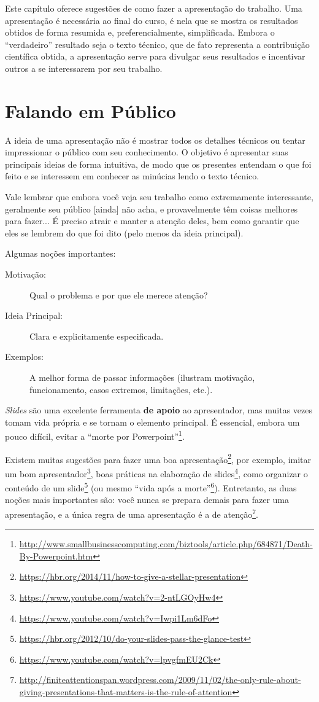 Este capítulo oferece sugestões de como fazer a apresentação do trabalho. Uma
apresentação é necessária ao final do curso, é nela que se mostra os resultados
obtidos de forma resumida e, preferencialmente, simplificada. Embora o ``verdadeiro''
resultado seja o texto técnico, que de fato representa a contribuição científica
obtida, a apresentação serve para divulgar seus resultados e incentivar outros a
se interessarem por seu trabalho.

\section{Falando em Público}
A ideia de uma apresentação não é mostrar todos os detalhes técnicos ou tentar
impressionar o público com seu conhecimento. O objetivo é apresentar suas principais
ideias de forma intuitiva, de modo que os presentes entendam o que foi feito e
se interessem em conhecer as minúcias lendo o texto técnico.

Vale lembrar que embora você veja seu trabalho como extremamente interessante,
geralmente seu público [ainda] não acha, e provavelmente têm coisas melhores para fazer...
É preciso atrair e manter a atenção deles, bem como garantir que eles se lembrem
do que foi dito (pelo menos da ideia principal).

Algumas noções importantes:
\begin{description}
\item[Motivação:] Qual o problema e por que ele merece atenção?
\item[Ideia Principal:] Clara e explicitamente especificada.
\item[Exemplos:] A melhor forma de passar informações (ilustram motivação,
funcionamento, casos extremos, limitações, etc.).
\end{description}

\emph{Slides} são uma excelente ferramenta \textbf{de apoio} ao apresentador, mas
muitas vezes tomam vida própria e se tornam o elemento principal. É essencial,
embora um pouco difícil,  evitar a ``morte por Powerpoint''\footnote{%
\url{http://www.smallbusinesscomputing.com/biztools/article.php/684871/Death-By-Powerpoint.htm}}.

Existem muitas sugestões para fazer uma boa apresentação\footnote{\url{https://hbr.org/2014/11/how-to-give-a-stellar-presentation}},
por exemplo, imitar um bom apresentador\footnote{\url{https://www.youtube.com/watch?v=2-ntLGOyHw4}}, boas práticas na elaboração de slides\footnote{\url{https://www.youtube.com/watch?v=Iwpi1Lm6dFo}}, como organizar o conteúdo de um slide\footnote{\url{https://hbr.org/2012/10/do-your-slides-pass-the-glance-test}} (ou mesmo ``vida após a morte''\footnote{\url{https://www.youtube.com/watch?v=lpvgfmEU2Ck}}). Entretanto, as duas noções mais importantes são: você nunca se prepara demais para fazer uma apresentação, e a única regra de uma apresentação é a
de atenção\footnote{\url{http://finiteattentionspan.wordpress.com/2009/11/02/the-only-rule-about-giving-presentations-that-matters-is-the-rule-of-attention}}.

